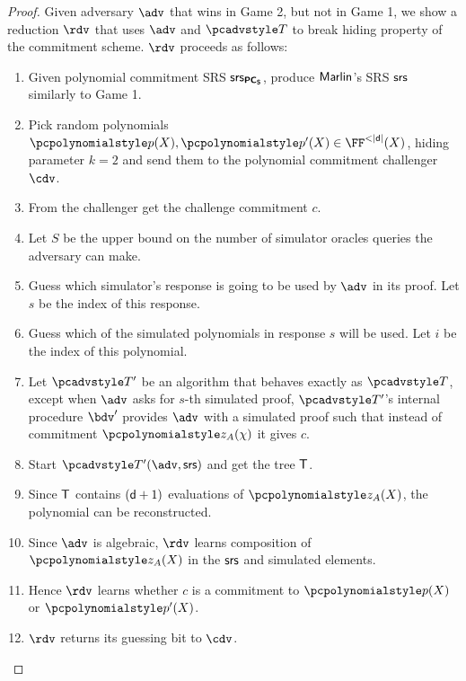\documentclass[runningheads,11pt]{llncs}
\begin{document}
\begin{proof}
   Given adversary $\adv$ that wins in Game 2, but not
  in Game 1, we show a reduction $\rdv$ that uses $\adv$ and $\tdv$ to break
  hiding property of the commitment scheme. $\rdv$ proceeds as follows:
  \begin{enumerate}
  \item Given polynomial commitment SRS $\mathsf{srs}_{\bm{\mathsf{PC}}_{\bm{\mathsf{S}}}}$, produce ${\textnormal{\textsf{Marlin}}}$'s SRS
    $\mathsf{srs}$ similarly to Game 1. 
  \item Pick random polynomials
    $\p{p} (X), \p{p'} (X) \in \FF^{< |\dconst|} (X)$, hiding parameter
    $k = 2$ and send them to the polynomial commitment challenger $\cdv$.
  \item From the challenger get the challenge commitment $c$.
  \item Let $S$ be the upper bound on the number of simulator oracles queries
    the adversary can make. 
  \item Guess which simulator's response is going to be used by $\adv$ in its
    proof. Let $s$ be the index of this response.
  \item Guess which of the simulated polynomials in response $s$ will be
    used. Let $i$ be the index of this polynomial.
  \item Let $\tdv'$ be an algorithm that behaves exactly as $\tdv$, except when
    $\adv$ asks for $s$-th simulated proof, $\tdv'$'s internal procedure $\bdv'$
    provides $\adv$ with a simulated proof such that instead of commitment
    $\p{z}_A (\chi)$ it gives $c$. 
  \item Start $\tdv'(\adv, \srs)$ and get the tree $\mathsf{T}$.
  \item Since $\mathsf{T}$ contains $(\mathsf{d} + 1)$ evaluations of $\p{z}_A (X)$, the
    polynomial can be reconstructed.
  \item Since $\adv$ is algebraic, $\rdv$ learns composition of $\p{z}_A (X)$
    in the $\mathsf{srs}$ and simulated elements.
  \item Hence $\rdv$ learns whether $c$ is a commitment to $\p{p} (X)$ or
    $\p{p'} (X)$.
  \item $\rdv$ returns its guessing bit to $\cdv$.
  \end{enumerate}


\end{proof}
\end{document}
